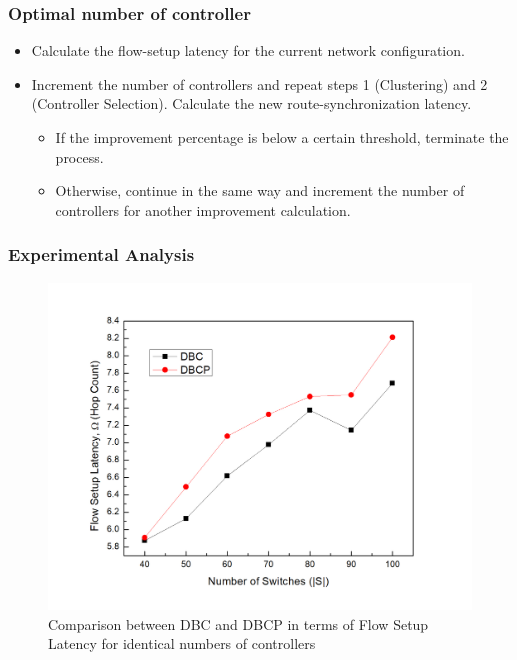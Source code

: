 \documentclass{beamer}
\begin{document}
\begin{frame}
\frametitle{Optimal number of controller}
\begin{itemize}
	\item Calculate the flow-setup latency for the current network configuration.
	\item Increment the number of controllers and repeat steps 1 (Clustering) and 2 (Controller Selection). Calculate the new route-synchronization latency.
	\begin{itemize}
		\item If the improvement percentage is below a certain threshold, terminate the process.
		\item Otherwise, continue in the same way and increment the number of controllers for another improvement calculation.
	\end{itemize}
\end{itemize}
\end{frame}

\begin{frame}
\frametitle{Experimental Analysis}
\begin{figure}
\includegraphics[width=0.8\linewidth]{Figures/dbc_vs_dbcp1.jpg}
\caption{Comparison between DBC and DBCP in terms of Flow Setup Latency for identical numbers of controllers}
\end{figure}
\end{frame}
\end{document}
